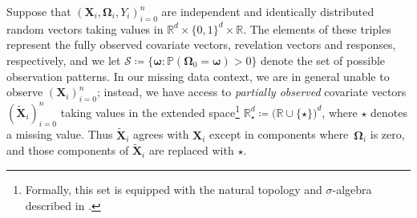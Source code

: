 \documentclass[12pt]{article}
\makeatletter
\newcommand{\ostar}{\mathbin{\mathpalette\make@circled\star}}
\newcommand{\make@circled}[2]{%
\ooalign{$\m@th#1\smallbigcirc{#1}$\cr\hidewidth$\m@th#1#2$\hidewidth\cr}%
}
\newcommand{\smallbigcirc}[1]{%
  \vcenter{\hbox{\scalebox{0.77778}{$\m@th#1\bigcirc$}}}%
}
\newcommand{\grey}[1]{\textcolor{lightgray}{#1}}
\def\tilde{\widetilde}
\makeatother
\begin{document}
Suppose that $(\bm{X}_i,\bm{\Omega}_i,Y_i)_{i=0}^{n}$ are independent and identically distributed random vectors taking values in $\mathbb{R}^d \times \{0,1\}^d \times \mathbb{R}$.  The elements of these triples represent the fully observed covariate vectors, revelation vectors and responses, respectively, and we let $\mathcal{S} \coloneqq \bigl\{\bm{\omega}: \mathbb{P}(\bm{\Omega}_0 = \bm\omega) > 0\bigr\}$ denote the set of possible observation patterns.  In our missing data context, we are in general unable to observe $(\bm{X}_i)_{i=0}^n$; instead, we have access to \emph{partially observed} covariate vectors $(\tilde{\bm{X}}_i)_{i=0}^n$ taking values in the extended space\footnote{Formally, this set is equipped with the natural topology and $\sigma$-algebra described in \citet[Section~2.1]{ma2024estimation}.}  $\mathbb{R}_{\star}^d \coloneqq \bigl(\mathbb{R} \cup \{\star\}\bigr)^d$, where $\star$ denotes a missing value.  Thus $\tilde{\bm{X}}_i$ agrees with $\bm{X}_i$ except in components where~$\bm{\Omega}_i$ is zero, and those components of $\tilde{\bm{X}}_i$ are replaced with $\star$.  
\end{document}
